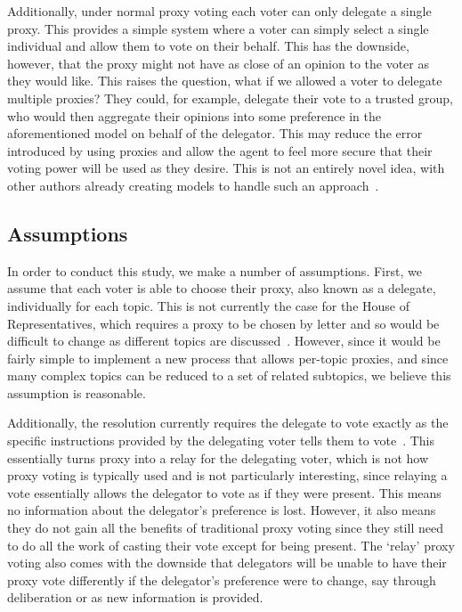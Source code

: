 Additionally, under normal proxy voting each voter can only delegate a single proxy.
This provides a simple system where a voter can simply select a single individual and
allow them to vote on their behalf.
This has the downside, however, that the proxy might not have as close of an opinion
to the voter as they would like.
This raises the question, what if we allowed a voter to delegate multiple proxies?
They could, for example, delegate their vote to a trusted group, who would then
aggregate their opinions into some preference in the aforementioned model on behalf of
the delegator.
This may reduce the error introduced by using proxies and allow the agent to feel
more secure that their voting power will be used as they desire.
This is not an entirely novel idea, with other authors already creating models to
handle such an approach~\cite{Degrave2014,Colley2021,Golz2021}.

\subsection{Assumptions}\label{subsec:assumptions}
In order to conduct this study, we make a number of assumptions.
First, we assume that each voter is able to choose their proxy, also known as a
delegate, individually for each topic.
This is not currently the case for the House of Representatives, which requires
a proxy to be chosen by letter and so would be difficult to change as different
topics are discussed~\cite{Congress.gov2020}.
However, since it would be fairly simple to implement a new process that allows
per-topic proxies, and since many complex topics can be reduced to a set of related
subtopics, we believe this assumption is reasonable.

Additionally, the resolution currently requires the delegate to vote exactly as the
specific instructions provided by the delegating voter tells them to
vote~\cite{CERP2020, Congress.gov2020}.
This essentially turns proxy into a relay for the delegating voter, which is not how
proxy voting is typically used and is not particularly interesting, since relaying a
vote essentially allows the delegator to vote as if they were present.
This means no information about the delegator's preference is lost.
However, it also means they do not gain all the benefits of traditional proxy voting
since they still need to do all the work of casting their vote except for being present.
The `relay' proxy voting also comes with the downside that delegators will be unable
to have their proxy vote differently if the delegator's preference were to change,
say through deliberation or as new information is provided.

